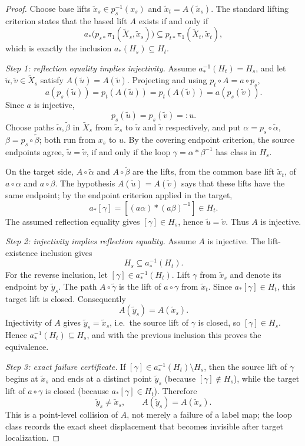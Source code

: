 \documentclass[11pt,reqno]{amsart}
\theoremstyle{definition}
\theoremstyle{remark}
\begin{document}
\begin{proof}
Choose base lifts \(\widetilde x_s\in p_s^{-1}(x_s)\) and
\(\widetilde x_t=A(\widetilde x_s)\).  The standard lifting criterion
states that the based lift \(A\) exists if and only if
\[
 a_*\bigl(p_{s*}\pi_1(\widetilde X_s,\widetilde x_s)\bigr)
 \subseteq
 p_{t*}\pi_1(\widetilde X_t,\widetilde x_t),
\]
which is exactly the inclusion \(a_*(H_s)\subseteq H_t\).

\emph{Step 1: reflection equality implies injectivity.}
Assume \(a_*^{-1}(H_t)=H_s\), and let
\(\widetilde u,\widetilde v\in\widetilde X_s\) satisfy
\(A(\widetilde u)=A(\widetilde v)\).  Projecting and using
\(p_t\circ A=a\circ p_s\),
\[
 a(p_s(\widetilde u))=p_t(A(\widetilde u))=p_t(A(\widetilde v))
 =a(p_s(\widetilde v)).
\]
Since \(a\) is injective,
\[
 p_s(\widetilde u)=p_s(\widetilde v)=:u .
\]
Choose paths \(\widetilde\alpha,\widetilde\beta\) in
\(\widetilde X_s\) from \(\widetilde x_s\) to \(\widetilde u\) and
\(\widetilde v\) respectively, and put
\(\alpha=p_s\circ\widetilde\alpha\),
\(\beta=p_s\circ\widetilde\beta\); both run from \(x_s\) to \(u\).
By the covering endpoint criterion, the source endpoints agree,
\(\widetilde u=\widetilde v\), if and only if the loop
\(\gamma=\alpha*\beta^{-1}\) has class in \(H_s\).

On the target side, \(A\circ\widetilde\alpha\) and
\(A\circ\widetilde\beta\) are the lifts, from the common base lift
\(\widetilde x_t\), of \(a\circ\alpha\) and \(a\circ\beta\).  The
hypothesis \(A(\widetilde u)=A(\widetilde v)\) says that these lifts
have the same endpoint; by the endpoint criterion applied in the
target,
\[
 a_*[\gamma]=[(a\alpha)*(a\beta)^{-1}]\in H_t .
\]
The assumed reflection equality gives \([\gamma]\in H_s\), hence
\(\widetilde u=\widetilde v\).  Thus \(A\) is injective.

\emph{Step 2: injectivity implies reflection equality.}
Assume \(A\) is injective.  The lift-existence inclusion gives
\[
 H_s\subseteq a_*^{-1}(H_t).
\]
For the reverse inclusion, let \([\gamma]\in a_*^{-1}(H_t)\).  Lift
\(\gamma\) from \(\widetilde x_s\) and denote its endpoint by
\(\widetilde y_s\).  The path \(A\circ\widetilde\gamma\) is the lift
of \(a\circ\gamma\) from \(\widetilde x_t\).  Since
\(a_*[\gamma]\in H_t\), this target lift is closed.  Consequently
\[
 A(\widetilde y_s)=A(\widetilde x_s).
\]
Injectivity of \(A\) gives \(\widetilde y_s=\widetilde x_s\), i.e.\ 
the source lift of \(\gamma\) is closed, so \([\gamma]\in H_s\).
Hence \(a_*^{-1}(H_t)\subseteq H_s\), and with the previous inclusion
this proves the equivalence.

\emph{Step 3: exact failure certificate.}
If \([\gamma]\in a_*^{-1}(H_t)\setminus H_s\), then the source lift of
\(\gamma\) begins at \(\widetilde x_s\) and ends at a distinct point
\(\widetilde y_s\) (because \([\gamma]\notin H_s\)), while the target
lift of \(a\circ\gamma\) is closed (because \(a_*[\gamma]\in H_t\)).
Therefore
\[
 \widetilde y_s\neq\widetilde x_s,
 \qquad
 A(\widetilde y_s)=A(\widetilde x_s).
\]
This is a point-level collision of \(A\), not merely a failure of a
label map; the loop class records the exact sheet displacement that
becomes invisible after target localization.
\end{proof}
\end{document}
